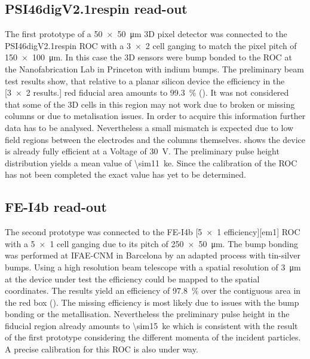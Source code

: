 \subsection{PSI46digV2.1respin read-out}
The first prototype of a \SI{50x50}{\micro\meter} 3D pixel detector was connected to the PSI46digV2.1respin \ac{ROC} \cite{kornmayer} with a \SI{3x2}{} cell ganging to match the pixel pitch of \SI{150x100}{\micro\meter}. In this case the 3D sensors were bump bonded to the \ac{ROC} at the Nanofabrication Lab in Princeton with indium bumps. The preliminary beam test results show, that relative to a planar silicon device the efficiency in the 
[\SI{3x2}{} results.]
red fiducial area amounts to \SI{99.3}{\%} (). It was not considered that some of the 3D cells in this region may not work due to broken or missing columns or due to metalisation issues. In order to acquire this information further data has to be analysed. Nevertheless a small mismatch is expected due to low field regions between the electrodes and the columns themselves.  shows the device is already fully efficient at a Voltage of \SI{30}{\volt}. The preliminary pulse height distribution yields a mean value of \SI{\sim11}{\kilo e}. Since the calibration of the \ac{ROC} has not been completed the exact value has yet to be determined.
\subsection{FE-I4b read-out}
The second prototype was connected to the FE-I4b 
[\SI{5x1}{} efficiency][em1]
\ac{ROC} \cite{fei4} with a \SI{5x1}{} cell ganging due to its pitch of \SI{250x50}{\micro\meter}. The bump bonding was performed at IFAE-CNM in Barcelona by an adapted process with tin-silver bumps. Using a high resolution beam telescope with a spatial resolution of \SI{3}{\micro\meter} at the device under test the efficiency could be mapped to the spatial coordinates. The results yield an efficiency of \SI{97.8}{\%} over the contiguous area in the red box (). The missing efficiency is most likely due to issues with the bump bonding or the metallisation. Nevertheless the preliminary pulse height in the fiducial region already amounts to \SI{\sim15}{\kilo e} which is consistent with the result of the first prototype considering the different momenta of the incident particles. A precise calibration for this \ac{ROC} is also under way.
